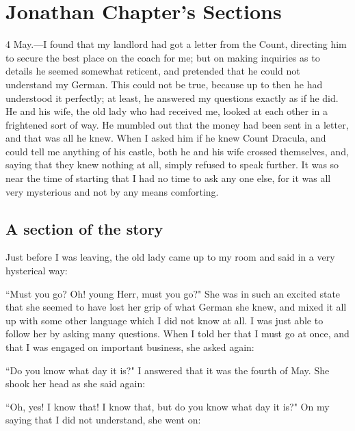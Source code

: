 \chapter{Jonathan Chapter's Sections}

4 May.---I found that my landlord had got a letter from the Count, directing him to secure the best place on the coach for me; but on making inquiries as to details he seemed somewhat reticent, and pretended that he could not understand my German. This could not be true, because up to then he had understood it perfectly; at least, he answered my questions exactly as if he did. He and his wife, the old lady who had received me, looked at each other in a frightened sort of way. He mumbled out that the money had been sent in a letter, and that was all he knew. When I asked him if he knew Count Dracula, and could tell me anything of his castle, both he and his wife crossed themselves, and, saying that they knew nothing at all, simply refused to speak further. It was so near the time of starting that I had no time to ask any one else, for it was all very mysterious and not by any means comforting.

\section{A section of the story}

Just before I was leaving, the old lady came up to my room and said in a very hysterical way:

``Must you go? Oh! young Herr, must you go?" She was in such an excited state that she seemed to have lost her grip of what German she knew, and mixed it all up with some other language which I did not know at all. I was just able to follow her by asking many questions. When I told her that I must go at once, and that I was engaged on important business, she asked again:

``Do you know what day it is?" I answered that it was the fourth of May. She shook her head as she said again:

``Oh, yes! I know that! I know that, but do you know what day it is?" On my saying that I did not understand, she went on:
